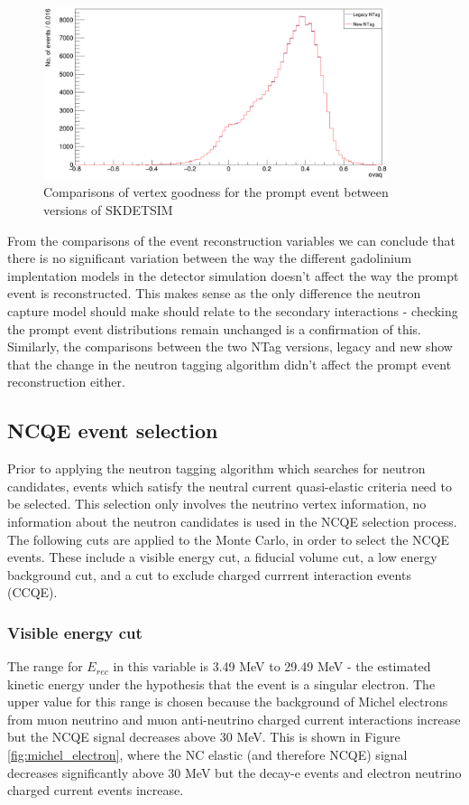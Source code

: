 \begin{figure}
    \centering
    \includegraphics[width=0.9\textwidth]{Figures/ovaq_recon_compare.PNG}
    \caption{Comparisons of vertex goodness for the prompt event between versions of SKDETSIM}
    \label{fig:ovaq_recon_compare}

\end{figure}

From the comparisons of the event reconstruction variables we can conclude that there is no significant variation between the way the different gadolinium implentation models in the detector simulation doesn't affect the way the prompt event is reconstructed. This makes sense as the only difference the neutron capture model should make should relate to the secondary interactions - checking the prompt event distributions remain unchanged is a confirmation of this. Similarly, the comparisons between the two NTag versions, legacy and new show that the change in the neutron tagging algorithm didn't affect the prompt event reconstruction either. 


\subsection{NCQE event selection}

Prior to applying the neutron tagging algorithm which searches for neutron candidates, events which satisfy the neutral current quasi-elastic criteria need to be selected. This selection only involves the neutrino vertex information, no information about the neutron candidates is used in the NCQE selection process. 
\newline
The following cuts are applied to the Monte Carlo, in order to select the NCQE events. These include a visible energy cut, a fiducial volume cut, a low energy background cut, and a cut to exclude charged currrent interaction events (CCQE). 

\subsubsection{Visible energy cut}
The range for $E_{rec}$ in this variable is 3.49 MeV to 29.49 MeV - the estimated kinetic energy under the hypothesis that the event is a singular electron. The upper value for this range is chosen because the background of Michel electrons from muon neutrino and muon anti-neutrino charged current interactions increase but the NCQE signal decreases above 30 MeV. This is shown in Figure \ref{fig:michel_electron}, where the NC elastic (and therefore NCQE) signal decreases significantly above 30 MeV but the decay-e events and electron neutrino charged current events increase.

